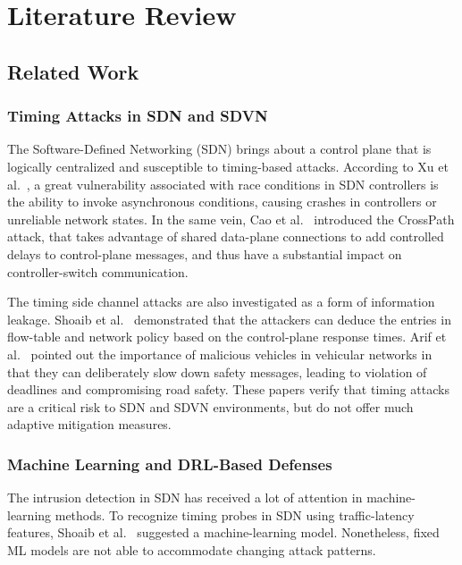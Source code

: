 \section{Literature Review}

\subsection{Related Work}

\subsubsection{Timing Attacks in SDN and SDVN}

The Software-Defined Networking (SDN) brings about a control plane that is logically centralized and susceptible to timing-based attacks. According to Xu et al.~\cite{Xu2015Race}, a great vulnerability associated with race conditions in SDN controllers is the ability to invoke asynchronous conditions, causing crashes in controllers or unreliable network states. In the same vein, Cao et al.~\cite{Cao2018CrossPath} introduced the CrossPath attack, that takes advantage of shared data-plane connections to add controlled delays to control-plane messages, and thus have a substantial impact on controller-switch communication.

The timing side channel attacks are also investigated as a form of information leakage. Shoaib et al.~\cite{Shoaib2021Timing} demonstrated that the attackers can deduce the entries in flow-table and network policy based on the control-plane response times. Arif et al.~\cite{Arif2019Timing} pointed out the importance of malicious vehicles in vehicular networks in that they can deliberately slow down safety messages, leading to violation of deadlines and compromising road safety. These papers verify that timing attacks are a critical risk to SDN and SDVN environments, but do not offer much adaptive mitigation measures.

\subsubsection{Machine Learning and DRL-Based Defenses}

The intrusion detection in SDN has received a lot of attention in machine-learning methods. To recognize timing probes in SDN using traffic-latency features, Shoaib et al.~\cite{Shoaib2023Detection} suggested a machine-learning model. Nonetheless, fixed ML models are not able to accommodate changing attack patterns.

